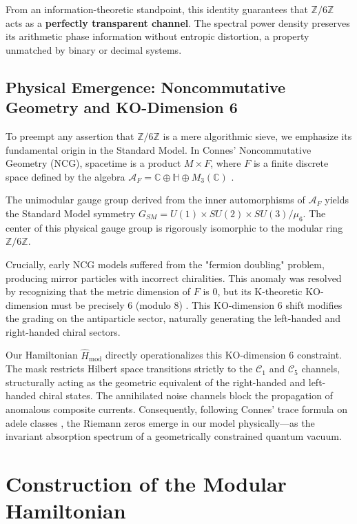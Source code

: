 \documentclass[prl,aps,floatfix,superscriptaddress,10pt]{revtex4-2}
\newcommand{\Zmod}{\mathbb{Z}/6\mathbb{Z}}
\begin{document}
From an information-theoretic standpoint, this identity guarantees that $\Zmod$ acts as a \textbf{perfectly transparent channel}. The spectral power density preserves its arithmetic phase information without entropic distortion, a property unmatched by binary or decimal systems.

\subsection{Physical Emergence: Noncommutative Geometry and KO-Dimension 6}

To preempt any assertion that $\Zmod$ is a mere algorithmic sieve, we emphasize its fundamental origin in the Standard Model. In Connes' Noncommutative Geometry (NCG), spacetime is a product $M \times F$, where $F$ is a finite discrete space defined by the algebra $\mathcal{A}_F = \mathbb{C} \oplus \mathbb{H} \oplus M_3(\mathbb{C})$ \cite{Connes2008}.

The unimodular gauge group derived from the inner automorphisms of $\mathcal{A}_F$ yields the Standard Model symmetry $G_{SM} = U(1) \times SU(2) \times SU(3) / \mu_6$. The center of this physical gauge group is rigorously isomorphic to the modular ring $\mathbb{Z}/6\mathbb{Z}$. 

Crucially, early NCG models suffered from the "fermion doubling" problem, producing mirror particles with incorrect chiralities. This anomaly was resolved by recognizing that the metric dimension of $F$ is 0, but its K-theoretic KO-dimension must be precisely 6 (modulo 8) \cite{Chamseddine2007}. This KO-dimension 6 shift modifies the grading on the antiparticle sector, naturally generating the left-handed and right-handed chiral sectors. 

Our Hamiltonian $\hat{H}_{\text{mod}}$ directly operationalizes this KO-dimension 6 constraint. The mask restricts Hilbert space transitions strictly to the $\mathcal{C}_1$ and $\mathcal{C}_5$ channels, structurally acting as the geometric equivalent of the right-handed and left-handed chiral states. The annihilated noise channels block the propagation of anomalous composite currents. Consequently, following Connes' trace formula on adele classes \cite{Connes1999}, the Riemann zeros emerge in our model physically—as the invariant absorption spectrum of a geometrically constrained quantum vacuum.

\section{Construction of the Modular Hamiltonian}
\end{document}
